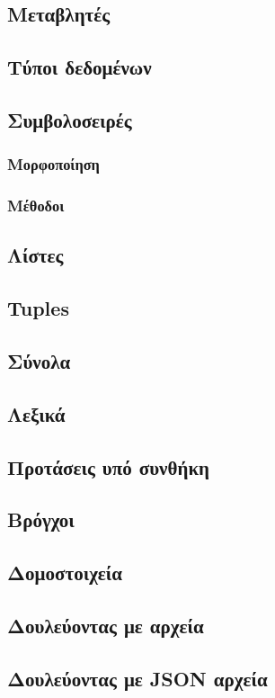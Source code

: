 \documentclass[a4paper,14pt]{extreport}
\begin{document}
\subsection{Μεταβλητές}
\subsection{Τύποι δεδομένων}
\subsection{Συμβολοσειρές}
\subsubsection{Μορφοποίηση}
\subsubsection{Μέθοδοι}
\subsection{Λίστες}
\subsection{Tuples}
\subsection{Σύνολα}
\subsection{Λεξικά}
\subsection{Προτάσεις υπό συνθήκη}
\subsection{Βρόγχοι}
\subsection{Δομοστοιχεία}
\subsection{Δουλεύοντας με αρχεία}
\subsection{Δουλεύοντας με JSON αρχεία}
\end{document}
